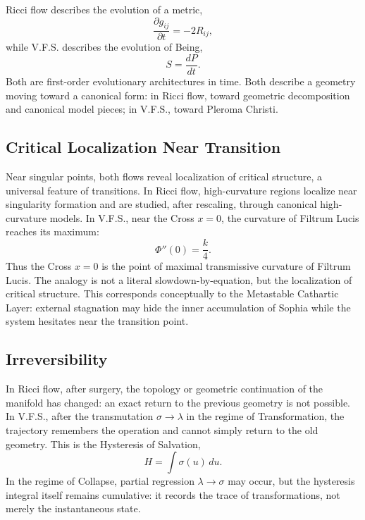 \documentclass[11pt]{article}
\newcommand{\VFS}{V.F.S.}
\begin{document}
Ricci flow describes the evolution of a metric,
\begin{equation}
\frac{\partial g_{ij}}{\partial t}=-2R_{ij},
\end{equation}
while \VFS{} describes the evolution of Being,
\begin{equation}
S=\frac{dP}{dt}.
\end{equation}
Both are first-order evolutionary architectures in time. Both describe a geometry moving toward a canonical form: in Ricci flow, toward geometric decomposition and canonical model pieces; in \VFS{}, toward Pleroma Christi.

\subsection{Critical Localization Near Transition}

Near singular points, both flows reveal localization of critical structure, a universal feature of transitions. In Ricci flow, high-curvature regions localize near singularity formation and are studied, after rescaling, through canonical high-curvature models. In \VFS{}, near the Cross $x=0$, the curvature of Filtrum Lucis reaches its maximum:
\begin{equation}
\Phi''(0)=\frac{k}{4}.
\end{equation}
Thus the Cross $x=0$ is the point of maximal transmissive curvature of Filtrum Lucis. The analogy is not a literal slowdown-by-equation, but the localization of critical structure. This corresponds conceptually to the Metastable Cathartic Layer: external stagnation may hide the inner accumulation of Sophia while the system hesitates near the transition point.

\subsection{Irreversibility}

In Ricci flow, after surgery, the topology or geometric continuation of the manifold has changed: an exact return to the previous geometry is not possible. In \VFS{}, after the transmutation $\sigma\to\lambda$ in the regime of Transformation, the trajectory remembers the operation and cannot simply return to the old geometry. This is the Hysteresis of Salvation,
\begin{equation}
H=\int \sigma(u)\,du.
\end{equation}
In the regime of Collapse, partial regression $\lambda\to\sigma$ may occur, but the hysteresis integral itself remains cumulative: it records the trace of transformations, not merely the instantaneous state.
\end{document}
